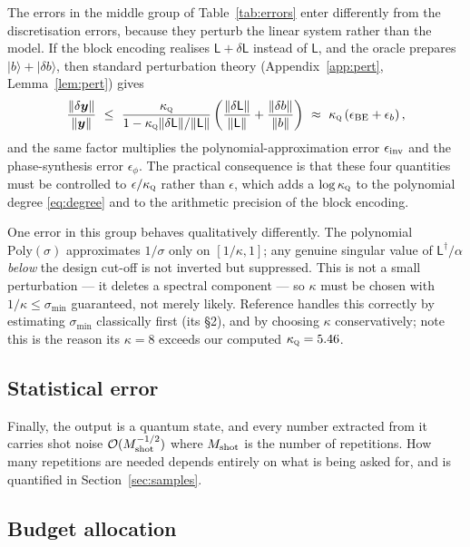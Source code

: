 \documentclass[11pt,a4paper]{article}
\theoremstyle{plain}
\theoremstyle{definition}
\theoremstyle{remark}
\newcommand{\Oh}{\mathcal{O}}
\newcommand{\ket}[1]{\lvert #1 \rangle}
\newcommand{\norm}[1]{\lVert #1 \rVert}
\newcommand{\yvec}{\bm{y}}
\newcommand{\Lmat}{\mathsf{L}}
\newcommand{\kQ}{\kappa_{\textsc{q}}}
\begin{document}
The errors in the middle group of Table~\ref{tab:errors} enter differently from
the discretisation errors, because they perturb the linear system rather than
the model.  If the block encoding realises $\Lmat+\delta\Lmat$ instead of
$\Lmat$, and the oracle prepares $\ket{b}+\ket{\delta b}$, then standard
perturbation theory (Appendix~\ref{app:pert}, Lemma~\ref{lem:pert}) gives
\begin{equation}
\frac{\norm{\delta\yvec}}{\norm{\yvec}}
\ \le\ \frac{\kQ}{1-\kQ\norm{\delta\Lmat}/\norm{\Lmat}}
\left(\frac{\norm{\delta\Lmat}}{\norm{\Lmat}}+\frac{\norm{\delta b}}{\norm{b}}\right)
\ \approx\ \kQ\left(\epsilon_{\rm BE}+\epsilon_b\right),
\label{eq:amplify}
\end{equation}
and the same factor multiplies the polynomial-approximation error
$\epsilon_{\rm inv}$ and the phase-synthesis error $\epsilon_\phi$.  The
practical consequence is that these four quantities must be controlled to
$\epsilon/\kQ$ rather than $\epsilon$, which adds a $\log\kQ$ to the polynomial
degree \eqref{eq:degree} and to the arithmetic precision of the block encoding.

One error in this group behaves qualitatively differently.  The polynomial
$\mathrm{Poly}(\sigma)$ approximates $1/\sigma$ only on $[1/\kappa,1]$; any
genuine singular value of $\Lmat^\dagger/\alpha$ \emph{below} the design cut-off
is not inverted but suppressed.  This is not a small perturbation --- it deletes
a spectral component --- so $\kappa$ must be chosen with
$1/\kappa\le\sigma_{\min}$ guaranteed, not merely likely.  Reference
\cite{Setty2026} handles this correctly by estimating $\sigma_{\min}$
classically first (its §2), and by choosing $\kappa$ conservatively; note this is
the reason its $\kappa=8$ exceeds our computed $\kQ=5.46$.

\subsection{Statistical error}
\label{sec:stat-err}

Finally, the output is a quantum state, and every number extracted from it
carries shot noise $\Oh(M_{\rm shot}^{-1/2})$ where $M_{\rm shot}$ is the number
of repetitions.  How many repetitions are needed depends entirely on what is
being asked for, and is quantified in Section~\ref{sec:samples}.

\subsection{Budget allocation}
\end{document}

